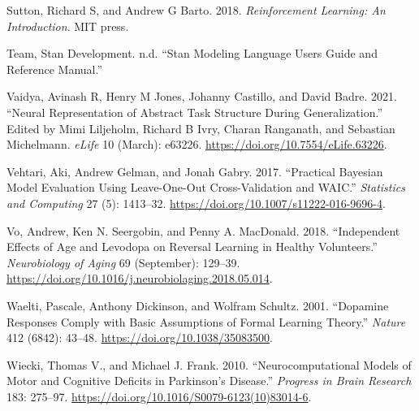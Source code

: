 \documentclass{article}
\newlength{\cslhangindent}
\newlength{\cslentryspacingunit} %
\newenvironment{CSLReferences}[2] %
 {%
  \setlength{\parindent}{0pt}
  \ifodd #1
  \let\oldpar\par
  \def\par{\hangindent=\cslhangindent\oldpar}
  \fi
  \setlength{\parskip}{#2\cslentryspacingunit}
 }%
 {}
\begin{document}
\begin{CSLReferences}{1}{0}
\leavevmode{}%
Sutton, Richard S, and Andrew G Barto. 2018. \emph{Reinforcement
Learning: {An} Introduction}. {MIT press}.

\leavevmode{}%
Team, Stan Development. n.d. {``Stan {Modeling Language Users Guide} and
{Reference Manual}.''}

\leavevmode{}%
Vaidya, Avinash R, Henry M Jones, Johanny Castillo, and David Badre.
2021. {``Neural Representation of Abstract Task Structure During
Generalization.''} Edited by Mimi Liljeholm, Richard B Ivry, Charan
Ranganath, and Sebastian Michelmann. \emph{eLife} 10 (March): e63226.
\url{https://doi.org/10.7554/eLife.63226}.

\leavevmode{}%
Vehtari, Aki, Andrew Gelman, and Jonah Gabry. 2017. {``Practical
{Bayesian} Model Evaluation Using Leave-One-Out Cross-Validation and
{WAIC}.''} \emph{Statistics and Computing} 27 (5): 1413--32.
\url{https://doi.org/10.1007/s11222-016-9696-4}.

\leavevmode{}%
Vo, Andrew, Ken N. Seergobin, and Penny A. MacDonald. 2018.
{``Independent Effects of Age and Levodopa on Reversal Learning in
Healthy Volunteers.''} \emph{Neurobiology of Aging} 69 (September):
129--39. \url{https://doi.org/10.1016/j.neurobiolaging.2018.05.014}.

\leavevmode{}%
Waelti, Pascale, Anthony Dickinson, and Wolfram Schultz. 2001.
{``Dopamine Responses Comply with Basic Assumptions of Formal Learning
Theory.''} \emph{Nature} 412 (6842): 43--48.
\url{https://doi.org/10.1038/35083500}.

\leavevmode{}%
Wiecki, Thomas V., and Michael J. Frank. 2010. {``Neurocomputational
Models of Motor and Cognitive Deficits in {Parkinson}'s Disease.''}
\emph{Progress in Brain Research} 183: 275--97.
\url{https://doi.org/10.1016/S0079-6123(10)83014-6}.

\end{CSLReferences}



\end{document}
